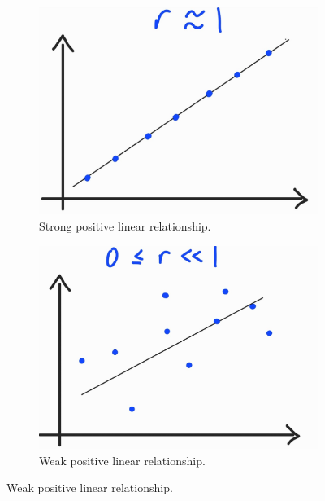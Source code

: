 \documentclass[../Notes.tex]{subfiles}
\begin{document}
\begin{figure}[htbp]
  \begin{subfigure}[c]{0.4\textwidth}
      \centering
      \includegraphics[width=\textwidth]{../images/product-moment-correlation-coefficient/r-is-1.jpg}
      \caption{Strong positive linear relationship.}
  \end{subfigure}\hspace{0.06666666666667\textwidth}
  \begin{subfigure}[c]{0.4\textwidth}
      \centering
      \includegraphics[width=\textwidth]{../images/product-moment-correlation-coefficient/small-positive-r.jpg}
      \caption{Weak positive linear relationship.}
  \end{subfigure}


\end{figure}
\end{document}
